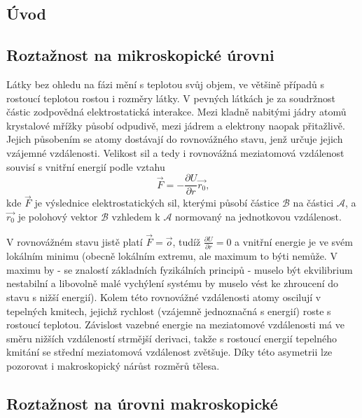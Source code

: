 \documentclass[a4paper,12pt]{article}   %
\begin{document}
\subsection{Úvod}
\label{ch:uvod}
\subsection{Roztažnost na mikroskopické úrovni}
Látky bez ohledu na fázi mění s teplotou svůj objem, ve většině případů s rostoucí teplotou rostou i rozměry látky. V pevných látkách je za soudržnost částic zodpovědná elektrostatická interakce. Mezi kladně nabitými jádry atomů krystalové mřížky působí odpudivě, mezi jádrem a elektrony naopak přitažlivě. Jejich působením se atomy dostávají do rovnovážného stavu, jenž určuje jejich vzájemné vzdálenosti. Velikost sil a tedy i rovnovážná meziatomová vzdálenost souvisí s vnitřní energií podle vztahu
\begin{equation}
  \vec{F} = - \frac{\partial U}{\partial r}\vec{r_0}\text{,}
\end{equation}
kde $\vec{F}$ je výslednice elektrostatických sil, kterými působí částice $\mathcal{B}$ na částici $\mathcal{A}$, a $\vec{r_0}$ je polohový vektor $\mathcal{B}$ vzhledem k $\mathcal{A}$ normovaný na jednotkovou vzdálenost.

V rovnovážném stavu jistě platí $\vec{F} = \vec{o}$, tudíž $\frac{\partial U}{\partial r} = 0$ a vnitřní energie je ve svém lokálním minimu (obecně lokálním extremu, ale maximum to býti nemůže. V maximu by - se znalostí základních fyzikálních principů - muselo být ekvilibrium nestabilní a libovolně malé vychýlení systému by muselo vést ke zhroucení do stavu s nižší energií). Kolem této rovnovážné vzdálenosti atomy oscilují v tepelných kmitech, jejichž rychlost (vzájemně jednoznačná s energií) roste s rostoucí teplotou. Závislost vazebné energie na meziatomové vzdálenosti má ve směru nižších vzdáleností strmější derivaci, takže s rostoucí energií tepelného kmitání se střední meziatomová vzdálenost zvětšuje. Díky této asymetrii lze pozorovat i makroskopický nárůst rozměrů tělesa.

\subsection{Roztažnost na úrovni makroskopické}
\end{document}
